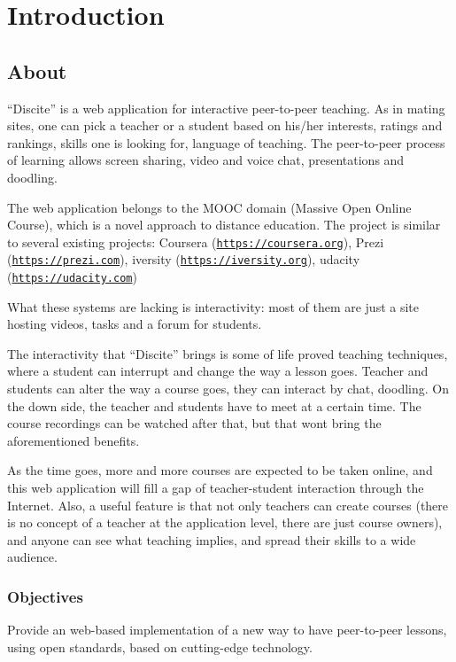 
\chapter{Introduction}
\label{Chapter1}

\section{About}
``Discite'' is a web application for interactive peer-to-peer
teaching. As in mating sites, one can pick a teacher or a student based on
his/her interests, ratings and rankings, skills one is looking for, language of
teaching. The peer-to-peer process of learning allows screen sharing, video and
voice chat, presentations and doodling.

The web application belongs to the MOOC domain (Massive Open Online Course),
which is a novel approach to distance education.
The project is similar to several existing projects:
Coursera (\href{https://coursera.org}{\texttt{https://coursera.org}}),
Prezi (\href{https://prezi.com}{\texttt{https://prezi.com}}),
iversity (\href{htpps://iversity.org}{\texttt{https://iversity.org}}),
udacity (\href{https://udacity.com}{\texttt{https://udacity.com}})

What these systems are lacking is interactivity: most of them are just a site
hosting videos, tasks and a forum for students.

The interactivity that ``Discite'' brings is some of life proved teaching
techniques, where a student can interrupt and change the way a lesson goes.
Teacher and students can alter the way a course goes, they can interact by chat,
doodling.
On the down side, the teacher and students have to meet at a certain time. The
course recordings can be watched after that, but that wont bring the
aforementioned benefits.

As the time goes, more and more courses are expected to be taken online, and
this web application will fill a gap of teacher-student interaction through the
Internet.
Also, a useful feature is that not only teachers can create courses
(there is no concept of a teacher at the application level, there are just
course owners), and anyone can see what teaching implies, and spread their
skills to a wide audience.

\subsection{Objectives}
Provide an web-based implementation of a new way to have peer-to-peer lessons,
using open standards, based on cutting-edge technology.

